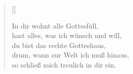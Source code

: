 \begin{center}
\settowidth{\versewidth}{Der, vor dem die Welt erschrickt,}
\begin{verse}[\versewidth]
  
 In dir wohnt alle Gottesfüll,\\
hast alles, was ich wünsch und will,\\
du bist das rechte Gotteshaus,\\
drum, wann zur Welt ich muß hinaus,\\
so schließ mich treulich in dir ein.
  
\end{verse}
\end{center}

